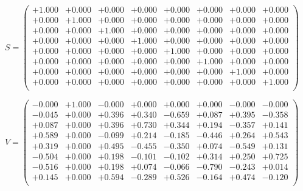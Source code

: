 \documentclass[9pt]{article}
\theoremstyle{plain}
\theoremstyle{definition}
\theoremstyle{remark}
\numberwithin{equation}{section}
\begin{document}
$S = \left(
\begin{array}{
cccccccc}
+1.000 & +0.000 & +0.000 & +0.000 & +0.000 & +0.000 & +0.000 & +0.000 \\
+0.000 & +1.000 & +0.000 & +0.000 & +0.000 & +0.000 & +0.000 & +0.000 \\
+0.000 & +0.000 & +1.000 & +0.000 & +0.000 & +0.000 & +0.000 & +0.000 \\
+0.000 & +0.000 & +0.000 & +1.000 & +0.000 & +0.000 & +0.000 & +0.000 \\
+0.000 & +0.000 & +0.000 & +0.000 & +1.000 & +0.000 & +0.000 & +0.000 \\
+0.000 & +0.000 & +0.000 & +0.000 & +0.000 & +1.000 & +0.000 & +0.000 \\
+0.000 & +0.000 & +0.000 & +0.000 & +0.000 & +0.000 & +1.000 & +0.000 \\
+0.000 & +0.000 & +0.000 & +0.000 & +0.000 & +0.000 & +0.000 & +1.000 \\
\end{array}
\right)$ \newline 

$V = \left(
\begin{array}{
cccccccc}
-0.000 & +1.000 & -0.000 & +0.000 & +0.000 & +0.000 & -0.000 & -0.000 \\
-0.045 & +0.000 & +0.396 & +0.340 & -0.659 & +0.087 & +0.395 & -0.358 \\
+0.087 & +0.000 & +0.396 & +0.730 & +0.344 & +0.194 & -0.357 & +0.141 \\
+0.589 & +0.000 & -0.099 & +0.214 & -0.185 & -0.446 & +0.264 & +0.543 \\
+0.319 & +0.000 & +0.495 & -0.455 & -0.350 & +0.074 & -0.549 & +0.131 \\
-0.504 & +0.000 & +0.198 & -0.101 & -0.102 & +0.314 & +0.250 & +0.725 \\
-0.516 & +0.000 & +0.198 & +0.074 & -0.066 & -0.790 & -0.243 & +0.014 \\
+0.145 & +0.000 & +0.594 & -0.289 & +0.526 & -0.164 & +0.474 & -0.120 \\
\end{array}
\right)$ \newline 
\end{document}
